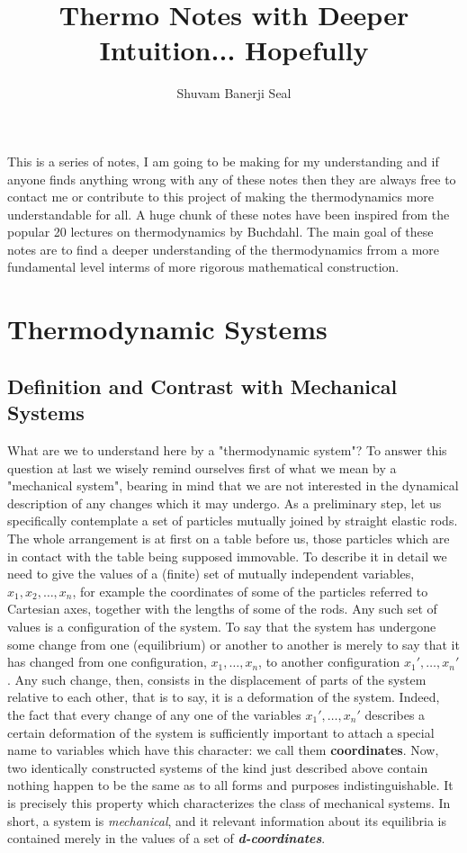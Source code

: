 \documentclass{article}
\title{Thermo Notes with Deeper Intuition... Hopefully}
\author{Shuvam Banerji Seal} %
\theoremstyle{definition}
\begin{document}
\maketitle
This is a series of notes, I am going to be making for my understanding and if anyone finds anything wrong with any of these notes then they are always free to contact me or contribute to this project of making the thermodynamics more understandable for all. A huge chunk of these notes have been inspired from the popular 20 lectures on thermodynamics by Buchdahl. The main goal of these notes are to find a deeper understanding of the thermodynamics frrom a more fundamental level interms of more rigorous mathematical construction. 

\tableofcontents

\section{Thermodynamic Systems}

\subsection{Definition and Contrast with Mechanical Systems}
What are we to understand here by a "thermodynamic system"? To answer this question at last we wisely remind ourselves first of what we mean by a "mechanical system", bearing in mind that we are not interested in the dynamical description of any changes which it may undergo. As a preliminary step, let us specifically contemplate a set of particles mutually joined by straight elastic rods. The whole arrangement is at first on a table before us, those particles which are in contact with the table being supposed immovable. To describe it in detail we need to give the values of a (finite) set of mutually independent variables, \( x_1, x_2, \ldots, x_n \), for example the coordinates of some of the particles referred to Cartesian axes, together with the lengths of some of the rods. Any such set of values is a configuration of the system. To say that the system has undergone some change from one (equilibrium) or another to another is merely to say that it has changed from one configuration, \( x_1, \ldots, x_n \), to another configuration \( x_1', \ldots, x_n' \). Any such change, then, consists in the displacement of parts of the system relative to each other, that is to say, it is a deformation of the system. Indeed, the fact that every change of any one of the variables \( x_1', \ldots, x_n' \) describes a certain deformation of the system is sufficiently important to attach a special name to variables which have this character: we call them \textbf{coordinates}. Now, two identically constructed systems of the kind just described above contain nothing happen to be the same as to all forms and purposes indistinguishable. It is precisely this property which characterizes the class of mechanical systems. In short, a system is \textit{mechanical}, and it relevant information about its equilibria is contained merely in the values of a set of \textit{\textbf{d-coordinates}}.
\end{document}
